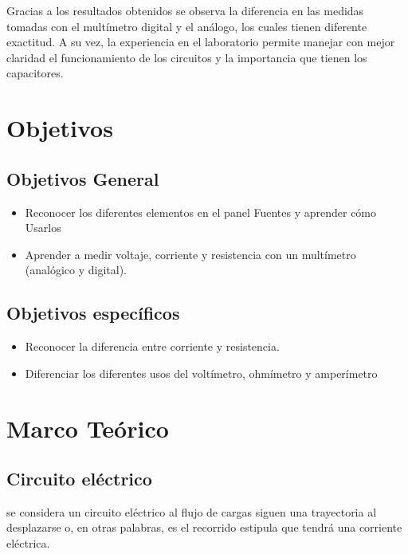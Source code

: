 \documentclass[letterpaper, 12pt]{report}
\begin{document}
Gracias a los resultados obtenidos se observa la diferencia en las medidas
tomadas con el multímetro digital y el análogo, los cuales tienen diferente
exactitud. A su vez, la experiencia en el laboratorio permite manejar con
mejor claridad el funcionamiento de los circuitos y la importancia que tienen
los capacitores.

\newpage

\section{Objetivos}

\subsection{Objetivos General}

\begin{itemize}
	\item Reconocer los diferentes elementos en el panel Fuentes y aprender
	      cómo Usarlos
	\item Aprender a medir voltaje, corriente y resistencia con un multímetro
	      (analógico y digital).
\end{itemize}

\subsection{Objetivos específicos}

\begin{itemize}
	\item Reconocer la diferencia entre corriente y resistencia.
	\item Diferenciar los diferentes usos  del voltímetro, ohmímetro y
	      amperímetro
\end{itemize}

\newpage

\section{Marco Teórico}

\subsection{Circuito eléctrico}

se considera un circuito eléctrico al flujo de cargas siguen una trayectoria
al desplazarse o, en otras palabras, es el recorrido estipula que tendrá una
corriente eléctrica.
\end{document}
